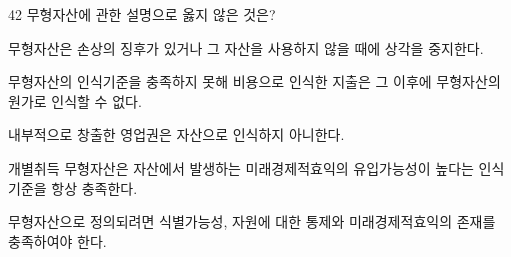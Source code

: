 \begin{question}{42}
무형자산에 관한 설명으로 옳지 않은 것은?
\begin{choices}
  \item 무형자산은 손상의 징후가 있거나 그 자산을 사용하지 않을 때에 상각을 중지한다.
  \item 무형자산의 인식기준을 충족하지 못해 비용으로 인식한 지출은 그 이후에 무형자산의 원가로 인식할 수 없다.
  \item 내부적으로 창출한 영업권은 자산으로 인식하지 아니한다.
  \item 개별취득 무형자산은 자산에서 발생하는 미래경제적효익의 유입가능성이 높다는 인식기준을 항상 충족한다.
  \item 무형자산으로 정의되려면 식별가능성, 자원에 대한 통제와 미래경제적효익의 존재를 충족하여야 한다.
\end{choices}
\end{question}
